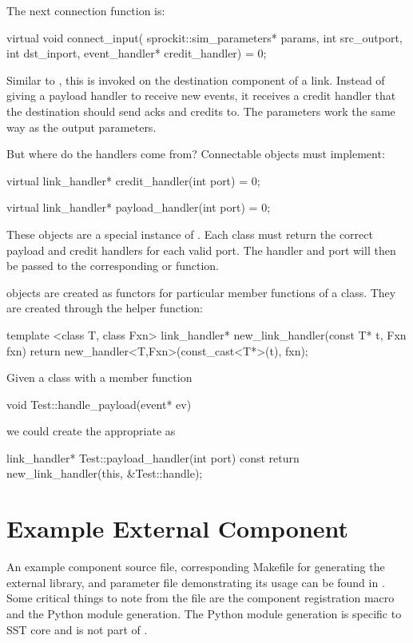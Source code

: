 The next connection function is:
\begin{CppCode}
  virtual void connect_input(
    sprockit::sim_parameters* params,
    int src_outport,
    int dst_inport,
    event_handler* credit_handler) = 0;
\end{CppCode}
Similar to , this is invoked on the destination component of a link.
Instead of giving a payload handler to receive new events,
it receives a credit handler that the destination should send acks and credits to.
The parameters work the same way as the output parameters.

But where do the handlers come from? Connectable objects must implement:

\begin{CppCode}
virtual link_handler* credit_handler(int port) = 0;

virtual link_handler* payload_handler(int port) = 0;
\end{CppCode}

These  objects are a special instance of .
Each class must return the correct payload and credit handlers for each valid port.
The handler and port will then be passed to the corresponding  or  function.

 objects are created as functors for particular member functions of a class.
They are created through the helper function:

\begin{CppCode}
template <class T, class Fxn>
link_handler* new_link_handler(const T* t, Fxn fxn){
  return new_handler<T,Fxn>(const_cast<T*>(t), fxn);
}
\end{CppCode}
Given a class  with a member function

\begin{CppCode}
void Test::handle_payload(event* ev)
\end{CppCode}
we could create the appropriate  as

\begin{CppCode}
link_handler* Test::payload_handler(int port) const {
  return new_link_handler(this, &Test::handle);
}
\end{CppCode}

\section{Example External Component}
An example component source file, corresponding Makefile for generating the external library, and parameter file demonstrating its usage can be found in .
Some critical things to note from the file  are the component registration macro and the Python module generation.
The Python module generation is specific to SST core and is not part of \sstmacro.

